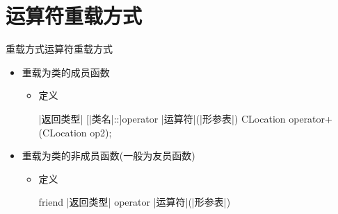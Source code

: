\section[重载方式]{运算符重载方式}\label{sec:chap04-sec03}
\begin{frame}[t, fragile]{重载方式}{运算符重载方式}%
  \begin{spacing}{1.8}
  \begin{itemize}
  \item 重载为类的成员函数
    \begin{itemize}
    \item 定义\\
      \begin{center}
        \begin{minipage}{0.8\linewidth}
          \begin{cpptt}
|返回类型| [|类名|::]operator |运算符|(|形参表|) {}
CLocation operator+(CLocation op2);
          \end{cpptt}
        \end{minipage}
      \end{center}
    \end{itemize}
  \item 重载为类的非成员函数(\alert{一般为友员函数})
    \begin{itemize}
    \item 定义\\
      \begin{center}
        \begin{minipage}{0.8\linewidth}
          \begin{cpptt}
friend |返回类型| operator |运算符|(|形参表|) {}
          \end{cpptt}
        \end{minipage}
      \end{center}
    \end{itemize}
  \end{itemize}
  \end{spacing}
\end{frame}

